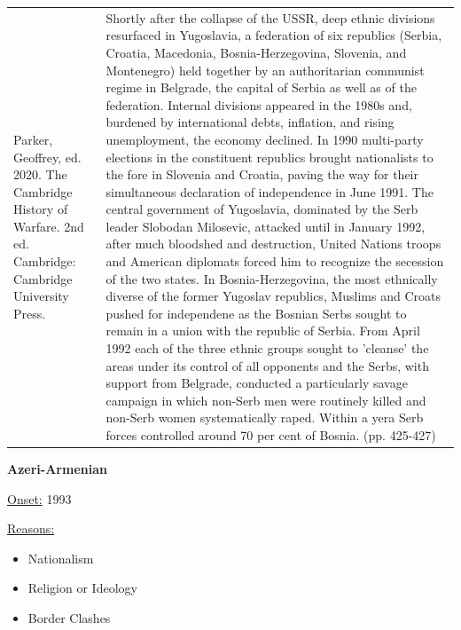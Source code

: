 {\begin{longtable}{p{}p{}}
Parker, Geoffrey, ed. 2020. The Cambridge History of Warfare. 2nd ed. Cambridge: Cambridge University Press. & Shortly after the collapse of the USSR, deep ethnic divisions resurfaced in Yugoslavia, a federation of six republics (Serbia, Croatia, Macedonia, Bosnia-Herzegovina, Slovenia, and Montenegro) held together by an authoritarian communist regime in Belgrade, the capital of Serbia as well as of the federation. Internal divisions appeared in the 1980s and, burdened by international debts, inflation,  and rising unemployment, the economy declined. In 1990 multi-party elections in the constituent republics brought nationalists to the fore in Slovenia and Croatia, paving the way for their simultaneous declaration of independence in June 1991. The central government of Yugoslavia, dominated by the Serb leader Slobodan Milosevic, attacked until in January 1992, after much bloodshed and destruction, United Nations troops and American diplomats forced him to recognize the secession of the two states. In Bosnia-Herzegovina, the most ethnically diverse of the former Yugoslav republics, Muslims and Croats pushed for independene as the Bosnian Serbs sought to remain in a union with the republic of Serbia. From April 1992 each of the three ethnic groups sought to 'cleanse' the areas under its control of all opponents and the Serbs, with support from Belgrade, conducted a particularly savage campaign in which non-Serb men were routinely killed and non-Serb women systematically raped. Within a yera Serb forces controlled around 70 per cent of Bosnia.  (pp. 425-427)
\\
\end{longtable}}
\clearpage
         \textbf{Azeri-Armenian} 

          \underline{Onset:} 1993         

\underline{Reasons:}
\begin{itemize}
\item Nationalism
\item Religion or Ideology
\item Border Clashes
\end{itemize}

